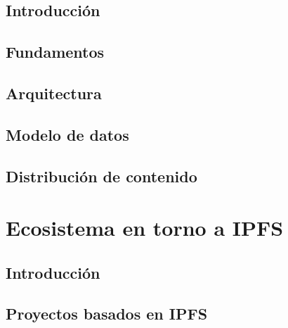 \label{sect:ipfs}
\subsection{Introducción}
\subsection{Fundamentos}
\subsection{Arquitectura}
\subsection{Modelo de datos}
\subsection{Distribución de contenido}

\section{Ecosistema en torno a IPFS}

\subsection{Introducción}
\subsection{Proyectos basados en IPFS} %
